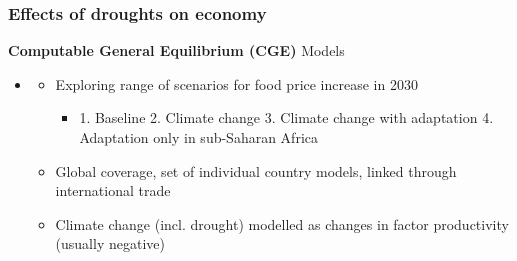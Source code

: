 \documentclass{beamer}              %
\begin{document}
\begin{frame}

\frametitle{Effects of droughts on economy}\label{Effects} 
\begin{block}{\textbf{Computable General Equilibrium (CGE)} Models }
\begin{itemize}




\item \underline{\textbf{\cite{OxfamIDS}}}
\begin{itemize}
\item Exploring range of scenarios for food price increase in 2030
\begin{itemize}
\item 1. Baseline 2. Climate change 3. Climate change with adaptation 4. Adaptation only in sub-Saharan Africa
\end{itemize}
\item Global coverage, set of individual country models, linked through international trade
\item Climate change (incl. drought) modelled as changes in factor productivity (usually negative)

\end{itemize}

\end{itemize}
\end{block}
\end{frame}



\end{document}
